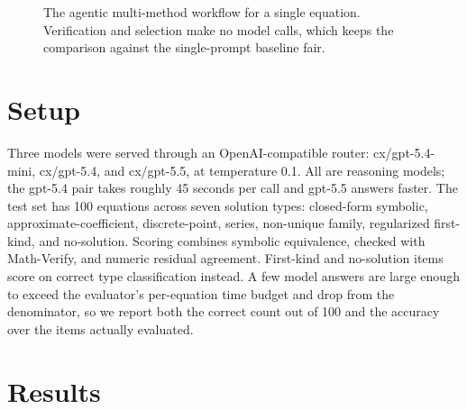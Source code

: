 \documentclass[11pt]{article}
\begin{document}
\begin{figure}[h]
\caption{The agentic multi-method workflow for a single equation. Verification
and selection make no model calls, which keeps the comparison against the
single-prompt baseline fair.}
\label{fig:flow}
\end{figure}

\section{Setup}
Three models were served through an OpenAI-compatible router: cx/gpt-5.4-mini,
cx/gpt-5.4, and cx/gpt-5.5, at temperature 0.1. All are reasoning models; the
gpt-5.4 pair takes roughly 45 seconds per call and gpt-5.5 answers faster. The
test set has 100 equations across seven solution types:
closed-form symbolic, approximate-coefficient, discrete-point, series,
non-unique family, regularized first-kind, and no-solution. Scoring combines
symbolic equivalence, checked with Math-Verify, and numeric residual agreement.
First-kind and no-solution items score on correct type classification instead.
A few model answers are large enough to exceed the evaluator's per-equation time
budget and drop from the denominator, so we report both the correct count out of
100 and the accuracy over the items actually evaluated.

\section{Results}
\end{document}
